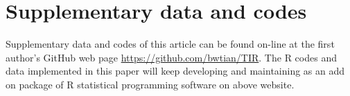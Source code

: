 \section{Supplementary data and codes}

Supplementary data and codes of this article can be found on-line at the first author's
GitHub web page \url{https://github.com/bwtian/TIR}. The R codes and data implemented in this paper
will keep developing and maintaining as an add on package of R statistical programming software on above website. 
